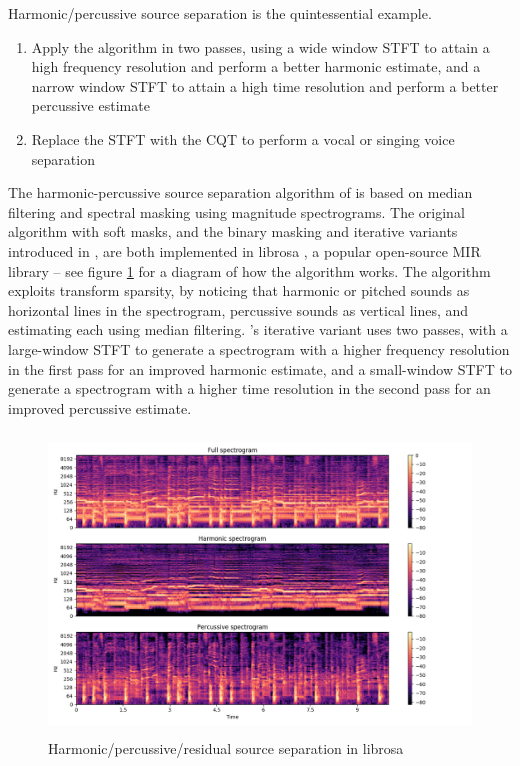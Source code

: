 \documentclass[letter,12pt,notitlepage]{article}
\begin{document}
Harmonic/percussive source separation is the quintessential example.

\begin{enumerate}
	\item
		Apply the algorithm in two passes, using a wide window STFT to attain a high frequency resolution and perform a better harmonic estimate, and a narrow window STFT to attain a high time resolution and perform a better percussive estimate \cite{fitzgerald2, driedger}
	\item
		Replace the STFT with the CQT to perform a vocal or singing voice separation \cite{fitzgerald2}
\end{enumerate}

The harmonic-percussive source separation algorithm of \textcite{fitzgerald1} is based on median filtering and spectral masking using magnitude spectrograms. The original algorithm with soft masks, and the binary masking and iterative variants introduced in \cite{driedger}, are both implemented in librosa \cite{librosa}, a popular open-source MIR library -- see figure \ref{fig:hpsslibrosa} for a diagram of how the algorithm works. The algorithm exploits transform sparsity, by noticing that harmonic or pitched sounds as horizontal lines in the spectrogram, percussive sounds as vertical lines, and estimating each using median filtering. \textcite{driedger}'s iterative variant uses two passes, with a large-window STFT to generate a spectrogram with a higher frequency resolution in the first pass for an improved harmonic estimate, and a small-window STFT to generate a spectrogram with a higher time resolution in the second pass for an improved percussive estimate.

\begin{figure}[ht]
	\centering
	\includegraphics[height=8cm]{./images-mss/sphx_glr_plot_hprss_001.png}
	\caption{Harmonic/percussive/residual source separation in librosa}
	\label{fig:hpsslibrosa}
\end{figure}
\end{document}
